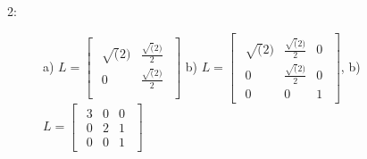 \documentclass{article}
\begin{document}
\begin{description}
    \item [2:] a)  $L = \begin{bmatrix}\begin{array}{cc} \sqrt(2) & \frac{\sqrt(2)}{2}\\ 0 & \frac{\sqrt(2)}{2}\\ \end{array}\end{bmatrix}$
    b) $L = \begin{bmatrix}\begin{array}{ccc} \sqrt(2) & \frac{\sqrt(2)}{2} & 0\\ 0 & \frac{\sqrt(2)}{2} & 0\\ 0 & 0 & 1 \end{array}\end{bmatrix}$,
    b) $L = \begin{bmatrix}\begin{array}{ccc} 3 & 0 & 0\\ 0 & 2 & 1\\ 0 & 0 & 1 \end{array}\end{bmatrix}$
     


\end{description}
\end{document}
